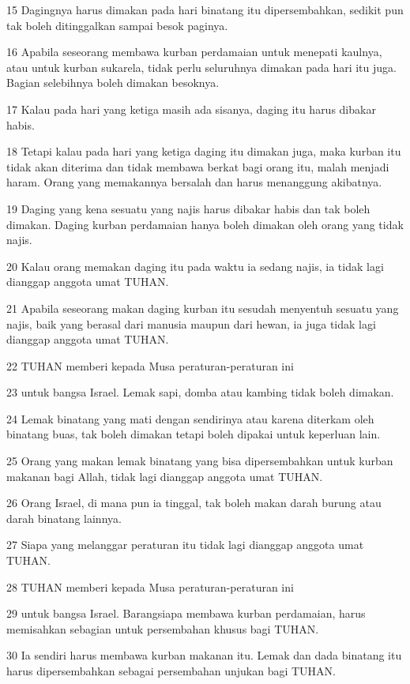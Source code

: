 \par 15 Dagingnya harus dimakan pada hari binatang itu dipersembahkan, sedikit pun tak boleh ditinggalkan sampai besok paginya.
\par 16 Apabila seseorang membawa kurban perdamaian untuk menepati kaulnya, atau untuk kurban sukarela, tidak perlu seluruhnya dimakan pada hari itu juga. Bagian selebihnya boleh dimakan besoknya.
\par 17 Kalau pada hari yang ketiga masih ada sisanya, daging itu harus dibakar habis.
\par 18 Tetapi kalau pada hari yang ketiga daging itu dimakan juga, maka kurban itu tidak akan diterima dan tidak membawa berkat bagi orang itu, malah menjadi haram. Orang yang memakannya bersalah dan harus menanggung akibatnya.
\par 19 Daging yang kena sesuatu yang najis harus dibakar habis dan tak boleh dimakan. Daging kurban perdamaian hanya boleh dimakan oleh orang yang tidak najis.
\par 20 Kalau orang memakan daging itu pada waktu ia sedang najis, ia tidak lagi dianggap anggota umat TUHAN.
\par 21 Apabila seseorang makan daging kurban itu sesudah menyentuh sesuatu yang najis, baik yang berasal dari manusia maupun dari hewan, ia juga tidak lagi dianggap anggota umat TUHAN.
\par 22 TUHAN memberi kepada Musa peraturan-peraturan ini
\par 23 untuk bangsa Israel. Lemak sapi, domba atau kambing tidak boleh dimakan.
\par 24 Lemak binatang yang mati dengan sendirinya atau karena diterkam oleh binatang buas, tak boleh dimakan tetapi boleh dipakai untuk keperluan lain.
\par 25 Orang yang makan lemak binatang yang bisa dipersembahkan untuk kurban makanan bagi Allah, tidak lagi dianggap anggota umat TUHAN.
\par 26 Orang Israel, di mana pun ia tinggal, tak boleh makan darah burung atau darah binatang lainnya.
\par 27 Siapa yang melanggar peraturan itu tidak lagi dianggap anggota umat TUHAN.
\par 28 TUHAN memberi kepada Musa peraturan-peraturan ini
\par 29 untuk bangsa Israel. Barangsiapa membawa kurban perdamaian, harus memisahkan sebagian untuk persembahan khusus bagi TUHAN.
\par 30 Ia sendiri harus membawa kurban makanan itu. Lemak dan dada binatang itu harus dipersembahkan sebagai persembahan unjukan bagi TUHAN.
